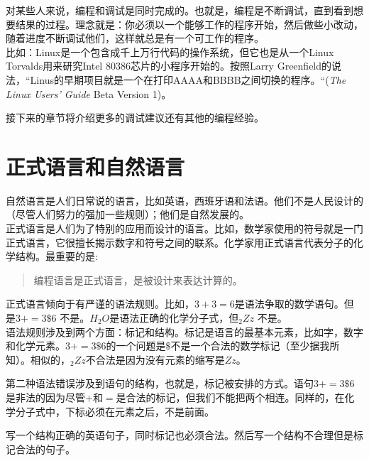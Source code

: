 
对某些人来说，编程和调试是同时完成的。也就是，编程是不断调试，直到看到想要结果的过程。理念就是：你必须以一个能够工作的程序开始，然后做些小改动，随着进度不断调试他们，这样就总是有一个可工作的程序。\\

比如：Linux是一个包含成千上万行代码的操作系统，但它也是从一个Linux Torvalds用来研究Intel 80386芯片的小程序开始的。按照Larry Greenfield的说法，“Linus的早期项目就是一个在打印AAAA和BBBB之间切换的程序。“({\em The Linux Users' Guide} Beta Version 1)。


接下来的章节将介绍更多的调试建议还有其他的编程经验。

\section{正式语言和自然语言}

自然语言是人们日常说的语言，比如英语，西班牙语和法语。他们不是人民设计的（尽管人们努力的强加一些规则）；他们是自然发展的。\\

正式语言是人们为了特别的应用而设计的语言。比如，数学家使用的符号就是一门正式语言，它很擅长揭示数字和符号之间的联系。化学家用正式语言代表分子的化学结构。最重要的是:

\begin{quote}
{编程语言是正式语言，是被设计来表达计算的。}
\end{quote}

正式语言倾向于有严谨的语法规则。比如，$3 + 3 = 6$是语法争取的数学语句。但是$3 += 3 \mbox{\$} 6$ 不是。$H_2O$是语法正确的化学分子式，但$_2Zz$ 不是。\\

语法规则涉及到两个方面：标记和结构。标记是语言的最基本元素，比如字，数字和化学元素。$3 += 3 \mbox{\$} 6$的一个问题是$\$$不是一个合法的数学标记（至少据我所知）。相似的，$_2Zz$不合法是因为没有元素的缩写是$Zz$。


第二种语法错误涉及到语句的结构，也就是，标记被安排的方式。语句$3 + = 3 \mbox{\$} 6$是非法的因为尽管$+$和$=$是合法的标记，但我们不能把两个相连。同样的，在化学分子式中，下标必须在元素之后，不是前面。

\begin{ex}
写一个结构正确的英语句子，同时标记也必须合法。然后写一个结构不合理但是标记合法的句子。
\end{ex}

